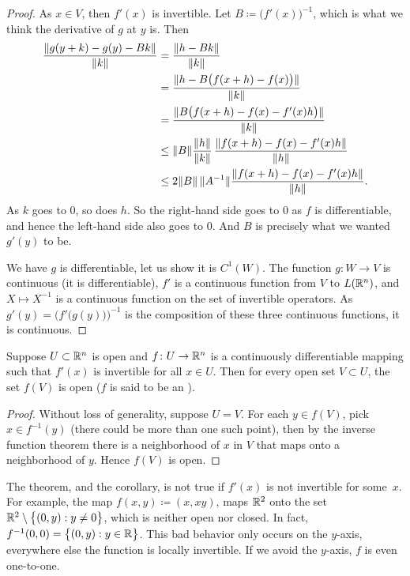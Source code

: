 \begin{proof}
As $x \in V$, then $f'(x)$ is invertible.
Let $B \coloneqq \bigl(f'(x)\bigr)^{-1}$, which is what we think the derivative of
$g$ at $y$ is.  Then
\begin{equation*}
\begin{split}
\frac{\lVert {g(y+k)-g(y)-Bk} \rVert}{\lVert {k} \rVert}
& =
\frac{\lVert {h-Bk} \rVert}{\lVert {k} \rVert}
\\
& =
\frac{\lVert {h-B\bigl(f(x+h)-f(x)\bigr)} \rVert}{\lVert {k} \rVert}
\\
& =
\frac{\lVert {B\bigl(f(x+h)-f(x)-f'(x)h\bigr)} \rVert}{\lVert {k} \rVert}
\\
& \leq
\lVert {B} \rVert
\frac{\lVert {h} \rVert}{\lVert {k} \rVert}\,
\frac{\lVert {f(x+h)-f(x)-f'(x)h} \rVert}{\lVert {h} \rVert}
\\
& \leq
2\lVert {B} \rVert \, \lVert {A^{-1}} \rVert
\frac{\lVert {f(x+h)-f(x)-f'(x)h} \rVert}{\lVert {h} \rVert} .
\end{split}
\end{equation*}
As $k$ goes to 0, so does $h$.  So the right-hand side goes to 0 as $f$ is
differentiable, and hence
the left-hand side also goes to 0.  And
$B$ is precisely what we wanted $g'(y)$ to be.

We have $g$ is differentiable, let us show it is $C^1(W)$.
The function $g \colon W \to V$ is continuous (it is differentiable),
$f'$ is a continuous function from $V$
to $L({\mathbb{R}}^n)$, and $X \mapsto X^{-1}$ is a continuous function on
the set of invertible operators.
As
$g'(y) = {\bigl( f'\bigl(g(y)\bigr)\bigr)}^{-1}$ is the composition
of these three
continuous functions, it is continuous.
\end{proof}

\begin{cor}
Suppose $U \subset {\mathbb{R}}^n$ is open and $f \colon U \to {\mathbb{R}}^n$ is a continuously
differentiable mapping such that $f'(x)$ is invertible for all $x \in U$.  Then
for every open set $V \subset U$, the set $f(V)$ is open ($f$ is said to be an
\emph{}).
\end{cor}

\begin{proof}
Without loss of generality, suppose $U=V$.
For each $y \in f(V)$, pick $x \in f^{-1}(y)$ (there could be more
than one such point), then by the inverse function theorem there is a
neighborhood of $x$ in $V$ that maps onto a neighborhood of $y$.  Hence
$f(V)$ is open.
\end{proof}

\begin{example}
The theorem, and the corollary, is not true if $f'(x)$ is not invertible for
some~$x$.  For example,
the map $f(x,y) \coloneqq (x,xy)$, maps ${\mathbb{R}}^2$ onto the set
${\mathbb{R}}^2 \setminus \bigl\{ (0,y) : y \neq 0 \bigr\}$, which is neither open nor closed.
In fact, $f^{-1}(0,0) = \bigl\{ (0,y) : y \in {\mathbb{R}} \bigr\}$.  This bad behavior
only occurs on the $y$-axis, everywhere else the function is locally
invertible.  If we avoid the $y$-axis, $f$ is even one-to-one.
\end{example}

